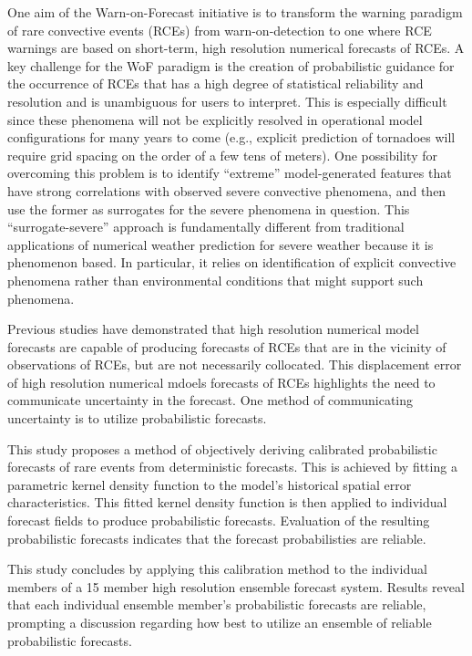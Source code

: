 

One aim of the Warn-on-Forecast initiative is to transform the warning paradigm of rare convective events (RCEs) from warn-on-detection to one where RCE warnings are based on short-term, high resolution numerical forecasts of RCEs.
A key challenge for the WoF paradigm is the creation of probabilistic guidance for the occurrence of RCEs that has a high degree of statistical reliability and resolution and is unambiguous for users to interpret.
This is especially difficult since these phenomena will not be explicitly resolved in operational model configurations for many years to come (e.g., explicit prediction of tornadoes will require grid spacing on the order of a few tens of meters).
One possibility for overcoming this problem is to identify ``extreme'' model-generated features that have strong correlations with observed severe convective phenomena, and then use the former as surrogates for the severe phenomena in question.
This ``surrogate-severe'' approach is fundamentally different from traditional applications of numerical weather prediction for severe weather because it is phenomenon based.
In particular, it relies on identification of explicit convective phenomena rather than environmental conditions that might support such phenomena.


Previous studies have demonstrated that high resolution numerical model forecasts are capable of producing forecasts of RCEs that are in the vicinity of observations of RCEs, but are not necessarily collocated.
This displacement error of high resolution numerical mdoels forecasts of RCEs highlights the need to communicate uncertainty in the forecast.
One method of communicating uncertainty is to utilize probabilistic forecasts.


This study proposes a method of objectively deriving calibrated probabilistic forecasts of rare events from deterministic forecasts.
This is achieved by fitting a parametric kernel density function to the model's historical spatial error characteristics.
This fitted kernel density function is then applied to individual forecast fields to produce probabilistic forecasts.
Evaluation of the resulting probabilistic forecasts indicates that the forecast probabilisties are reliable.


This study concludes by applying this calibration method to the individual members of a 15 member high resolution ensemble forecast system.
Results reveal that each individual ensemble member's probabilistic forecasts are reliable, prompting a discussion regarding how best to utilize an ensemble of reliable probabilistic forecasts.